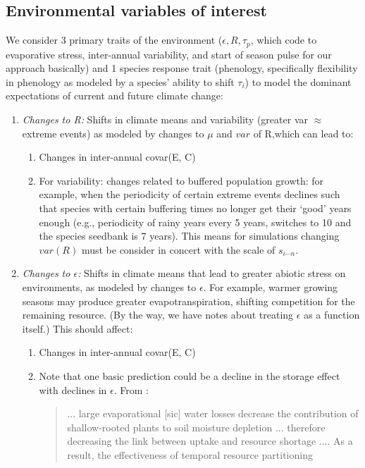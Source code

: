 \documentclass[11pt,a4paper,oneside]{article}
\begin{document}
\subsection{Environmental variables of interest}
We consider 3 primary traits of the environment (\(\epsilon, R, \tau_{p}\), which
code to evaporative stress, inter-annual variability, and start of season pulse for our approach basically) and 1
species response trait (phenology, specifically flexibility in
phenology as modeled by a species' ability to shift \(\tau_{i}\)) to model
the dominant expectations of current and future climate change:
\begin{enumerate}
\item \emph{Changes to R:} Shifts in climate means and variability (greater var \(\approx\)
  extreme events) as modeled by changes to \(\mu\) and \(var\) of
    R,which can lead to:
\begin{enumerate}
\item Changes in inter-annual covar(E, C)
\item For variability: changes related to buffered population growth:
  for example, when the periodicity of certain extreme events declines
  such that species with certain buffering times no longer get their
  `good' years enough (e.g., periodicity of rainy years every 5 years,
  switches to 10 and the species seedbank is 7 years). This means for
  simulations changing \(var(R)\) must be consider in concert with the
  scale of \(s_{i\cdots n}\).
\end{enumerate}
\item \emph{Changes to \(\epsilon\):} Shifts in climate means that lead to greater abiotic stress on
  environments, as modeled by changes to  \(\epsilon\). For example,
  warmer growing seasons may produce greater evapotranspiration,
  shifting competition for the remaining resource. (By the way, we
  have notes about treating \(\epsilon\) as a function itself.) This should
  affect:
\begin{enumerate}
\item Changes in inter-annual covar(E, C)
\item Note that one basic prediction could be a decline in the storage effect with declines in \(\epsilon\). From \citet{Chesson:2004eo}:
\begin{quote}
... large evaporational [sic] water
losses decrease the contribution of shallow-rooted plants
to soil moisture depletion ... therefore decreasing the link
between uptake and resource shortage .... As
a result, the effectiveness of temporal resource partitioning

\end{quote}
\end{enumerate}
\end{enumerate}
\end{document}
